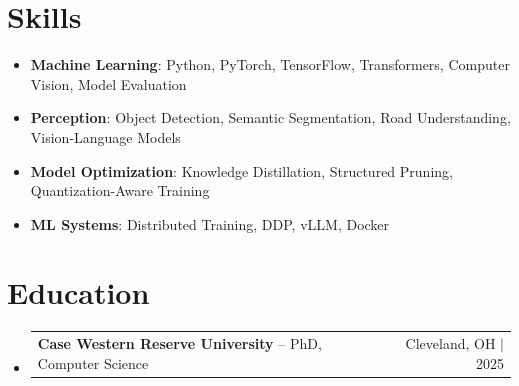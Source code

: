 \documentclass[letterpaper,13pt]{article}
\makeatletter
\newcommand{\resumeProjectHeading}[2]{
    \item
    \begin{tabular*}{\textwidth}{l@{\extracolsep{\fill}}r}
      \small#1 & #2 \\
    \end{tabular*}\vspace{-4pt}
}
\newcommand{\resumeSubHeadingListStart}{\begin{itemize}[leftmargin=0in, label={}]}
\newcommand{\resumeSubHeadingListEnd}{\end{itemize}}
\makeatother
\begin{document}
\section{Skills}
\vspace{0.02cm}
\begin{itemize}[leftmargin=0.15in, label={}, itemsep=2pt, topsep=1pt]
  \item \textbf{Machine Learning}: Python, PyTorch, TensorFlow, Transformers, Computer Vision, Model Evaluation
  \item \textbf{Perception}: Object Detection, Semantic Segmentation, Road Understanding, Vision-Language Models
  \item \textbf{Model Optimization}: Knowledge Distillation, Structured Pruning, Quantization-Aware Training
  \item \textbf{ML Systems}: Distributed Training, DDP, vLLM, Docker
\end{itemize}
\vspace{0.02cm}

\section{Education}
\resumeSubHeadingListStart
  \resumeProjectHeading{\textbf{Case Western Reserve University} -- PhD, Computer Science}{Cleveland, OH $|$ 2025}
\resumeSubHeadingListEnd
\end{document}
